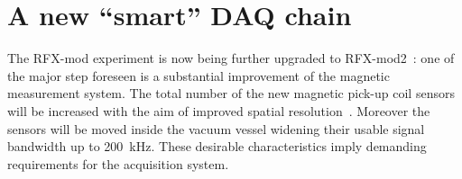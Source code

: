 







\section{A new “smart” DAQ chain}





The RFX-mod experiment is now being further upgraded to RFX-mod2~\cite{Peruzzo2018}: one of the major step foreseen is a substantial improvement of the magnetic measurement system. The total number of the new magnetic pick-up coil sensors will be increased with the aim of improved spatial resolution~\cite{marchiori2017upgraded}. Moreover the sensors will be moved inside the vacuum vessel widening their usable signal bandwidth up to 200~kHz. These desirable characteristics imply demanding requirements for the acquisition system. 

